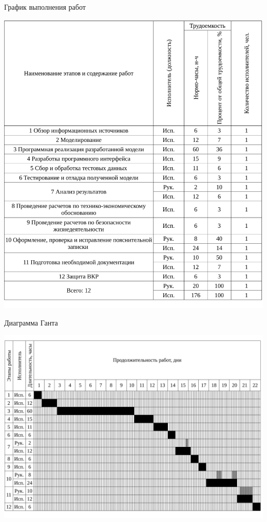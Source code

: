 \begin{table}[!ht]
\caption{График выполнения работ}
\centering
\includegraphics[page=1, width=1\linewidth]{tables/economics/schedule.pdf}
\label{tab:job_is_done_1}
\end{table}


\begin{table}[!ht]
\caption{Диаграмма Ганта}
\centering
\includegraphics[page=1, width=1\linewidth]{tables/economics/grantt.pdf}
\label{tab:job_is_done_2}
\end{table}

